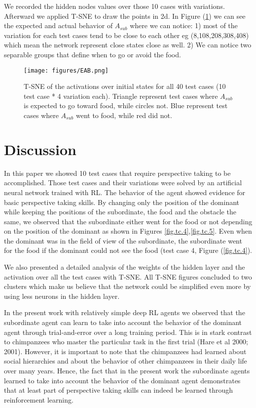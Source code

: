 \documentclass{article}
\begin{document}
We recorded the hidden nodes values over those 10 cases with variations. Afterward we applied T-SNE to draw the points in 2d. In Figure (\ref{fig.EAB}) we can see the expected and actual behavior of \(A_{sub}\) where we can notice: 1) most of the variation for each test cases tend to be close to each other eg (8,108,208,308,408) which mean the network represent close states close as well. 2) We can notice two separable groups that define when to go or avoid the food.

\begin{figure}[H]
\centering
\texttt{[image: figures/EAB.png]}
\caption{T-SNE of the activations over initial states for all 40 test cases (10 test case * 4 variation each). Triangle represent test cases where \(A_{sub}\) is  expected to go toward food, while circles not. Blue represent test cases where \(A_{sub}\) went  to food, while red did not.}
\label{fig.EAB}
\end{figure}

\section{Discussion}
In this paper we showed 10 test cases that require perspective taking to be accomplished. Those test cases and their variations were solved by an artificial neural network trained with RL. The behavior of the agent showed evidence for basic perspective taking skills. By changing only the position of the dominant while keeping the positions of the subordinate, the food and the obstacle the same, we observed that the subordinate either went for the food or not depending on the position of the dominant as shown in Figures \ref{fig.tc.4},\ref{fig.tc.5}. Even when the dominant was in the field of view of the subordinate, the subordinate went for the food if the dominant could not see the food (test case 4, Figure (\ref{fig.tc.4}).  

We also presented a detailed analysis of the weights of the hidden layer and the activation over all the test cases with T-SNE. All T-SNE figures concluded to two clusters which make us believe that the network could be simplified even more by using less neurons in the hidden layer. 

In the present work with relatively simple deep RL agents we observed that the subordinate agent can learn to take into account the behavior of the dominant agent through trial-and-error over a long training period. This is in stark contrast to chimpanzees who master the particular task in the first trial  (Hare et al 2000; 2001). However, it is important to note that the chimpanzees had learned about social hierarchies and about the behavior of other chimpanzees in their daily life over many years. Hence, the fact that in the present work the subordinate agents learned to take into account the behavior of the dominant agent demonstrates that at least part of perspective taking skills can indeed be learned through reinforcement learning. 
\end{document}
